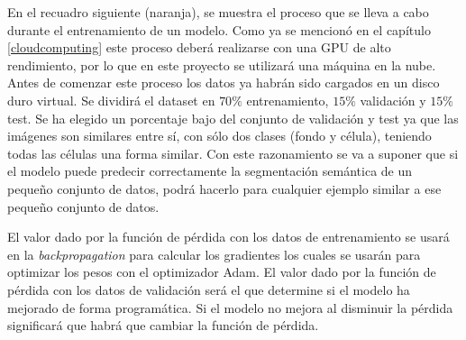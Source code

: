En el recuadro siguiente (naranja), se muestra el proceso que se lleva a cabo durante el entrenamiento de un modelo. Como ya se mencionó en el capítulo \ref{cloudcomputing} este proceso deberá realizarse con una GPU de alto rendimiento, por lo que en este proyecto se utilizará una máquina en la nube. Antes de comenzar este proceso los datos ya habrán sido cargados en un disco duro virtual. Se dividirá el dataset en $ 70\% $ entrenamiento, $ 15\% $ validación y $ 15\% $ test. Se ha elegido un porcentaje bajo del conjunto de validación y test ya que las imágenes son similares entre sí, con sólo dos clases (fondo y célula), teniendo todas las células una forma similar. Con este razonamiento se va a suponer que si el modelo puede predecir correctamente la segmentación semántica de un pequeño conjunto de datos, podrá hacerlo para cualquier ejemplo similar a ese pequeño conjunto de datos.





El valor dado por la función de pérdida con los datos de entrenamiento se usará en la \textit{backpropagation} para calcular los gradientes los cuales se usarán para optimizar los pesos con el optimizador Adam. El valor dado por la función de pérdida con los datos de validación será el que determine si el modelo ha mejorado de forma programática. Si el modelo no mejora al disminuir la pérdida significará que habrá que cambiar la función de pérdida.


